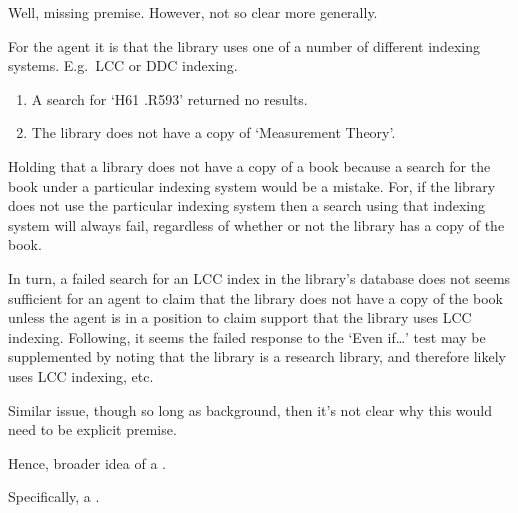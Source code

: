 \begin{note}
  Well, missing premise.
  However, not so clear more generally.
\end{note}

\begin{note}
  \begin{illustration}
    For the agent it is \epVAd{} that the library uses one of a number of different indexing systems.
    E.g.\ LCC or DDC indexing.
    \begin{enumerate}
    \item A search for `H61 .R593' returned no results.
    \item The library does not have a copy of `Measurement Theory'.
    \end{enumerate}
  \end{illustration}

  Holding that a library does not have a copy of a book because a search for the book under a particular indexing system would be a mistake.
  For, if the library does not use the particular indexing system then a search using that indexing system will always fail, regardless of whether or not the library has a copy of the book.

  In turn, a failed search for an LCC index in the library's database does not seems sufficient for an agent to claim that the library does not have a copy of the book unless the agent is in a position to claim support that the library uses LCC indexing.
  Following, it seems the failed response to the `Even if\dots' test may be supplemented by noting that the library is a research library, and therefore likely uses LCC indexing, etc.\
\end{note}

\begin{note}
  Similar issue, though so long as background, then it's not clear why this would need to be explicit premise.

  Hence, broader idea of a \requ{}.
\end{note}

\begin{note}
  Specifically, a \crequ{}.
\end{note}

